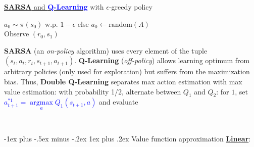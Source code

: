 \documentclass[10pt,landscape]{article}
\makeatletter
\renewcommand{\subsubsection}{\@startsection{subsubsection}{3}{0mm}%
                                {-1ex plus -.5ex minus -.2ex}%
                                {1ex plus .2ex}%
                                {\normalfont\small\bfseries}}
\makeatother
\begin{document}
\begin{multicols}{3}
\underline{\textbf{SARSA} and \textcolor{blue}{\textbf{Q-Learning}}} with $\epsilon$-greedy policy
\begin{algorithm}[H]
$a_0\sim\pi(s_0)$ w.p. $1-\epsilon$ else $a_0\gets\text{random}(A)$
\\
Observe $(r_0,s_1)$
\\
\end{algorithm}
\textbf{SARSA} (an \textit{on-policy} algorithm) uses every element of the tuple $(s_t,a_t,r_t,s_{t+1},a_{t+1})$. \textbf{Q-Learning} (\textit{off-policy}) allows learning optimum from arbitrary policies (only used for exploration) but suffers from the maximization bias. Thus, \textbf{Double Q-Learning} separates max action estimation with max value estimation: with probability 1/2, alternate between $Q_1$ and $Q_2$: for $1$, set \textcolor{blue}{$a^{*1}_{t+1}=\mathop{\arg\max}\limits_{a}Q_1(s_{t+1},a)$} and evaluate
\vspace{-3mm}
\begin{center}
\\
\end{center}





\subsubsection{Value function approximation}
\underline{\textbf{Linear}}: 


\end{multicols}
\end{document}
